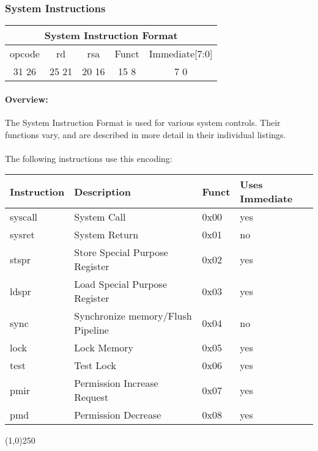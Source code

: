 \documentclass[letterpaper, 11pt]{article}
\begin{document}
\newpage
\subsubsection{System Instructions}
\begin{center}
	\begin{tabular}{|c|c|c|c|c|}
		\multicolumn{5}{c}{System Instruction Format}\\ \hline
			\hspace{2pt} opcode \hspace{2pt} & \hspace{5pt} rd \hspace{5pt} &  \hspace{4pt} rsa \hspace{4pt} & \hspace{10pt}Funct  \hspace{10pt} & \hspace{8pt} Immediate[7:0] \hspace{8pt}   \\	\hline
		31 \hfill 26& 25 \hfill 21 &20 \hfill  16& 15 \hfill  8&7 \hfill   0\\ \hline
		
	\end{tabular}
\end{center}
\paragraph{Overview:} The System Instruction Format is used for various system controls. Their functions
vary, and are described in more detail in their individual listings.
\paragraph{}The following instructions use this encoding: \\
\begin{center}
	\begin{tabular}{|l|l|l|l|} \hline
			Instruction & Description 						& Funct & Uses Immediate\\ \hline
			syscall		& System Call						& 0x00  & yes \\ \hline
			sysret		& System Return						& 0x01  & no  \\ \hline
			stspr		& Store Special Purpose Register	& 0x02  & yes \\ \hline
			ldspr		& Load Special Purpose Register		& 0x03  & yes \\ \hline
			sync		& Synchronize memory/Flush Pipeline  & 0x04  & no  \\ \hline
			lock		& Lock Memory						& 0x05  & yes \\ \hline
			test		& Test Lock 						& 0x06  & yes \\ \hline
			pmir		& Permission Increase Request		& 0x07  & yes \\ \hline
			pmd			& Permission Decrease				& 0x08  & yes \\ \hline


\end{tabular}
\end{center}
\begin{center}
	\line(1,0){250}
\end{center}
\newpage
\end{document}
